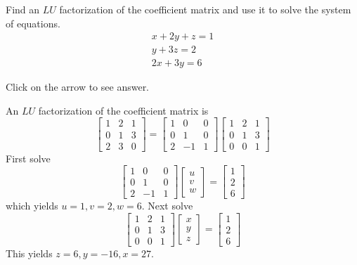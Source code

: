 \documentclass{ximera}
\begin{document}
\begin{problem}\label{prb:4.71} Find an $LU$ factorization of the coefficient matrix and use it to solve the system of equations.
\begin{equation*}
\begin{array}{c}
x+2y+z=1 \\
y+3z=2 \\
2x+3y=6
\end{array}
\end{equation*}

Click on the arrow to see answer.
\begin{expandable}
An $LU$ factorization of the coefficient matrix is
\[
\left[
\begin{array}{rrr}
1 & 2 & 1 \\
0 & 1 & 3 \\
2 & 3 & 0
\end{array}
\right] = \left[
\begin{array}{rrr}
1 & 0 & 0 \\
0 & 1 & 0 \\
2 & -1 & 1
\end{array}
\right] \left[
\begin{array}{rrr}
1 & 2 & 1 \\
0 & 1 & 3 \\
0 & 0 & 1
\end{array}
\right]
\]
First solve
\[
 \left[
\begin{array}{rrr}
1 & 0 & 0 \\
0 & 1 & 0 \\
2 & -1 & 1
\end{array}
\right] \left[
\begin{array}{c}
u \\
v \\
w
\end{array}
\right] =\left[
\begin{array}{c}
1 \\
2 \\
6
\end{array}
\right]
\]
which yields $u=1,v=2,w=6$. Next solve
\[
\left[
\begin{array}{rrr}
1 & 2 & 1 \\
0 & 1 & 3 \\
0 & 0 & 1
\end{array}
\right] \left[
\begin{array}{c}
x \\
y \\
z
\end{array}
\right] =\left[
\begin{array}{c}
1 \\
2 \\
6
\end{array}
\right]
\]
This yields $z=6,y=-16,x=27.$
\end{expandable}
\end{problem}
\end{document}

